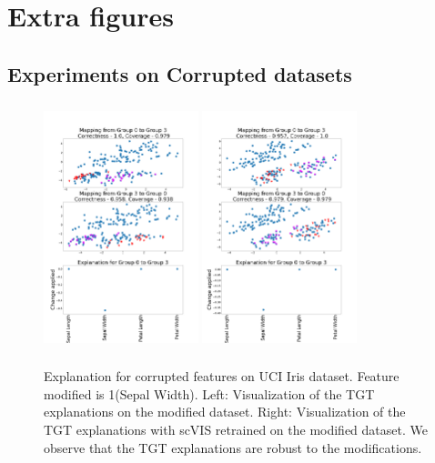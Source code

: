\section{Extra figures}
\subsection{Experiments on Corrupted datasets}
\label{app:t2c}
\begin{figure}[H]
    \centering
    \includegraphics[width=0.4\textwidth, height=7.2cm]{images/tffigures/iris-t2c.png}
    \includegraphics[width=0.4\textwidth, height=7.2cm]{images/tffigures/iris-retrained-t2c.png}
    \caption{Explanation for corrupted features on UCI Iris dataset. Feature modified is 1(Sepal Width). Left: Visualization of the TGT explanations on the modified dataset. Right: Visualization of the TGT explanations with scVIS retrained on the modified dataset. We observe that the TGT explanations are robust to the modifications.}
    \label{fig:t2c-Iris}
\end{figure}
